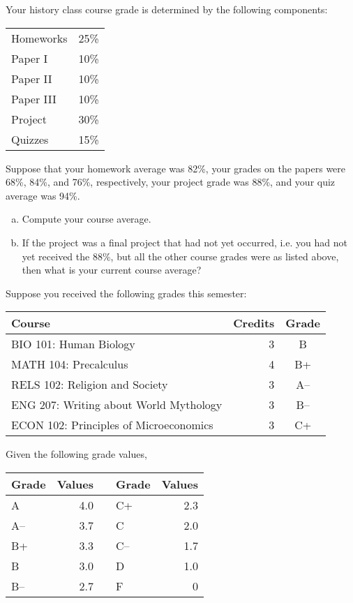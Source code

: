 \documentclass[11pt,letterpaper]{article}
\begin{document}

 Your history class course grade is determined by the following components: \par
	\begin{table}[h]
	\centering
	\begin{tabular}{lr}
	Homeworks & 25\% \\
	Paper I & 10\% \\
	Paper II & 10\% \\
	Paper III & 10\% \\
	Project & 30\% \\
	Quizzes & 15\%
	\end{tabular}
	\end{table} \par
Suppose that your homework average was 82\%, your grades on the papers were 68\%, 84\%, and 76\%, respectively, your project grade was 88\%, and your quiz average was 94\%. 
	\begin{enumerate}[(a)]
	\item Compute your course average.
	\item If the project was a final project that had not yet occurred, i.e. you had not yet received the 88\%, but all the other course grades were as listed above, then what is your current course average?
	\end{enumerate}



\newpage



 Suppose you received the following grades this semester: \par
	\begin{table}[h]
	\centering
	\begin{tabular}{lrc}
	Course & Credits & Grade \\ \hline
	BIO 101: Human Biology & 3 & B \\
	MATH 104: Precalculus & 4 & B+ \\
	RELS 102: Religion and Society & 3 & A-- \\
	ENG 207: Writing about World Mythology & 3 & B-- \\
	ECON 102: Principles of Microeconomics & 3 & C+
	\end{tabular}
	\end{table} \par
Given the following grade values, 
	\begin{table}[h]
	\centering
	\begin{tabular}{lrclr}
	Grade & Values & & Grade & Values \\ \hline
	A & 4.0 & \hspace{1cm} & C+ & 2.3 \\
	A-- & 3.7 & & C & 2.0 \\
	B+ & 3.3 & & C-- & 1.7 \\
	B & 3.0 & & D & 1.0 \\
	B-- & 2.7 & & F & 0
	\end{tabular}
	\end{table}
\end{document}
